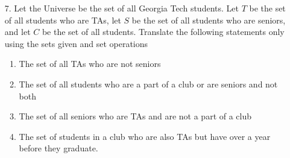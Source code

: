 \begin{enumerate}
\begin{solutiondraft}
    
    \end{solutiondraft}
    \begin{comment}
        here is where you type in your explain.
    \end{comment}




    
    \item[7.]
    Let the Universe be the set of all Georgia Tech students. Let $T$ be the set of all students who are TAs, let $S$ be the set of all students who are seniors, and let $C$ be the set of all students. Translate the following statements only using the sets given and set operations
        \begin{enumerate}
            \item The set of all TAs who are not seniors
            \item The set of all students who are a part of a club or are seniors and not both
            \item The set of all seniors who are TAs and are not a part of a club
            \item The set of students in a club who are also TAs but have over a year before they graduate.
        \end{enumerate}
    \begin{solutiondraft}
    
    \end{solutiondraft}
    \begin{comment}
        here is where you type in your explain.
    \end{comment}



    
\end{enumerate}